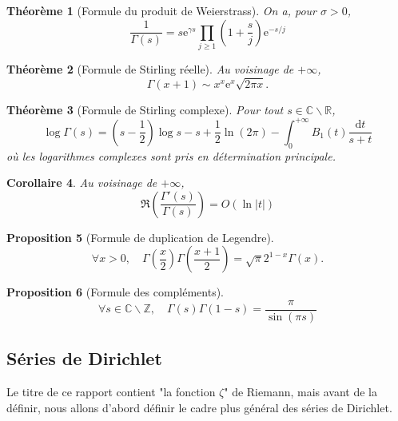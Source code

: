 \documentclass[french]{report}
\newtheorem{theorem}{Théorème}[section]
\newtheorem{proposition}[theorem]{Proposition}
\newtheorem{corollary}[theorem]{Corollaire}
\begin{document}
\begin{theorem}[Formule du produit de Weierstrass]\label{thm:gamma-weierstrass}
  On a, pour $\sigma>0$,
  \[
    \frac{1}{\Gamma(s)}
    =s\mathrm{e}^{\gamma s}\prod_{j\geq 1}\left(1+\frac{s}{j}\right)\mathrm{e}^{-s/j}
  \]
\end{theorem}

\begin{theorem}[Formule de Stirling réelle]\label{thm:stirling-reel}
  Au voisinage de $+\infty$,
  \[
    \Gamma(x+1)
    \sim x^x\mathrm{e}^x\sqrt{2\pi x}.
  \]
\end{theorem}

\begin{theorem}[Formule de Stirling complexe]\label{thm:stirling-complexe}
  Pour tout $s\in\mathbb{C}\backslash\mathbb{R}$,
  \[
    \log\Gamma(s)
    = (s-\frac{1}{2})\log s
    - s
    + \frac{1}{2}\ln(2\pi)
    - \int_0^{+\infty} B_1(t)\frac{\mathrm{d}t}{s+t}
  \]
  où les logarithmes complexes sont pris en détermination principale.
\end{theorem}

\begin{corollary}\label{cor:gamma-gamma-prime-majoration}
  Au voisinage de $+\infty$,
  \[
    \Re\left(\frac{\Gamma'(s)}{\Gamma(s)}\right) = O(\ln|t|)
  \]
\end{corollary}

\begin{proposition}[Formule de duplication de Legendre]\label{prop:gamma-duplication-legendre}
  \[
    \forall x>0,\quad
    \Gamma\left(\frac{x}{2}\right)\Gamma\left(\frac{x+1}{2}\right)
    =\sqrt{\pi}2^{1-x}\Gamma(x).
  \]
\end{proposition}

\begin{proposition}[Formule des compléments]\label{prop:gamma-formule-complements}
  \[
    \forall s\in\mathbb{C}\backslash\mathbb{Z},\quad
    \Gamma(s)\Gamma(1-s)=\frac{\pi}{\sin(\pi s)}
  \]
\end{proposition}

\subsection{Séries de Dirichlet}

Le titre de ce rapport contient "la fonction $\zeta$" de Riemann, mais avant de la définir, nous allons d'abord définir le cadre plus général des séries de Dirichlet.
\end{document}
